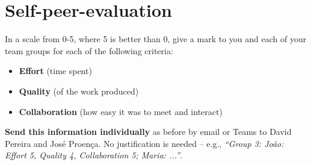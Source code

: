 \documentclass[11pt]{article}
\begin{document}



\section*{Self-peer-evaluation}
\begin{myExercise}
  In a scale from 0-5, where 5 is better than 0, give a mark to you and each of your team groups for each of the following criteria:
  \begin{itemize}
    \item \textbf{Effort} (time spent)
    \item \textbf{Quality} (of the work produced)
    \item \textbf{Collaboration} (how easy it was to meet and interact)
  \end{itemize}
  \textbf{Send this information individually} as before by email or Teams to David Pereira and Jos\'{e} Proen\c{c}a. No justification is needed -- e.g., \emph{``Group 3: Jo\~{a}o: Effort 5, Quality 4, Collaboration 5; Maria: ...''}.
\end{myExercise}


 
\end{document}
